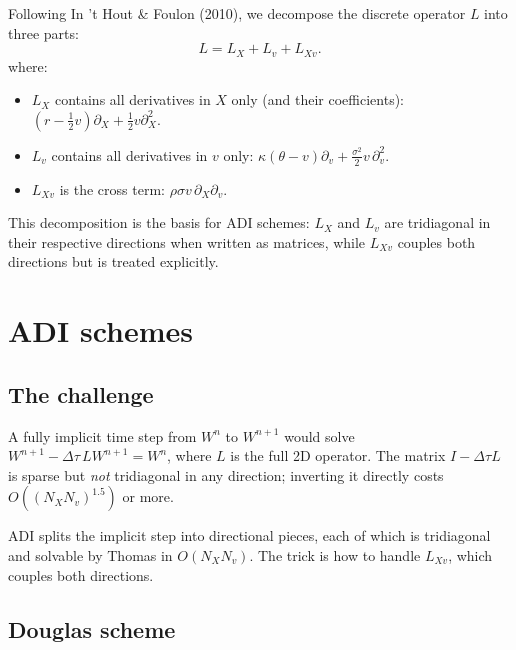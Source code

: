 \documentclass[11pt]{article}
\theoremstyle{plain}
\theoremstyle{definition}
\theoremstyle{remark}
\begin{document}
Following In 't Hout \& Foulon (2010), we decompose the discrete operator $L$ into three parts:
\begin{equation}
    L = L_X + L_v + L_{Xv}.                                                                                  \label{eq:operator-split}
\end{equation}
where:
\begin{itemize}[topsep=2pt]
    \item $L_X$ contains all derivatives in $X$ only (and their coefficients): $(r - \tfrac12 v) \partial_X + \tfrac12 v \partial^2_X$.
    \item $L_v$ contains all derivatives in $v$ only: $\kappa(\theta - v) \partial_v + \tfrac{\sigma^2}{2} v\, \partial^2_v$.
    \item $L_{Xv}$ is the cross term: $\rho\sigma v\, \partial_X \partial_v$.
\end{itemize}
This decomposition is the basis for ADI schemes: $L_X$ and $L_v$ are tridiagonal in their respective directions when written as matrices, while $L_{Xv}$ couples both directions but is treated explicitly.

\section{ADI schemes}

\subsection{The challenge}

A fully implicit time step from $W^n$ to $W^{n+1}$ would solve $W^{n+1} - \Delta\tau\, L W^{n+1} = W^n$, where $L$ is the full 2D operator. The matrix $I - \Delta\tau L$ is sparse but \emph{not} tridiagonal in any direction; inverting it directly costs $O((N_X N_v)^{1.5})$ or more.

ADI splits the implicit step into directional pieces, each of which is tridiagonal and solvable by Thomas in $O(N_X N_v)$. The trick is how to handle $L_{Xv}$, which couples both directions.

\subsection{Douglas scheme}
\end{document}
